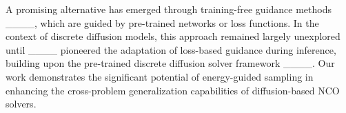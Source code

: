 A promising alternative has emerged through training-free guidance methods ____, which are guided by pre-trained networks or loss functions. In the context of discrete diffusion models, this approach remained largely unexplored until ____ pioneered the adaptation of loss-based guidance during inference, building upon the pre-trained discrete diffusion solver framework ____. Our work demonstrates the significant potential of energy-guided sampling in enhancing the cross-problem generalization capabilities of diffusion-based NCO solvers.
